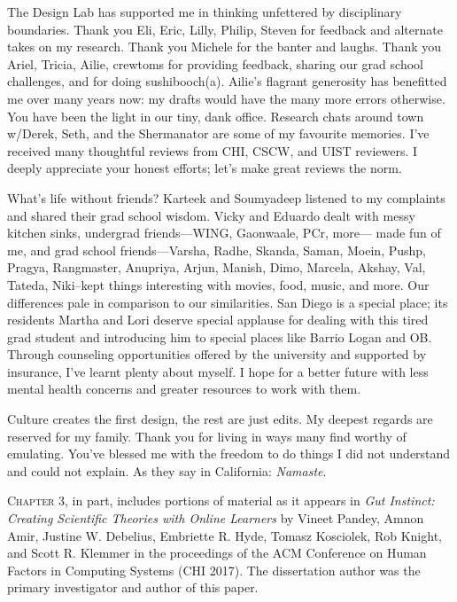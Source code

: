 \begin{frontmatter}
\begin{acknowledgements}
The Design Lab has supported me in thinking unfettered by disciplinary boundaries. Thank you Eli, Eric, Lilly, Philip, Steven for feedback and alternate takes on my research. Thank you Michele for the banter and laughs. Thank you Ariel, Tricia, Ailie, crewtoms for providing feedback, sharing our grad school challenges, and for doing sushibooch(a). Ailie's flagrant generosity has benefitted me over many years now: my drafts would have the many more errors otherwise. You have been the light in our tiny, dank office. Research chats around town w/Derek, Seth, and the Shermanator are some of my favourite memories. I’ve received many thoughtful reviews from CHI, CSCW, and UIST reviewers. I deeply appreciate your honest efforts; let’s make great reviews the norm.

What’s life without friends? Karteek and Soumyadeep listened to my complaints and shared their grad school wisdom. Vicky and Eduardo dealt with messy kitchen sinks, undergrad friends---WING, Gaonwaale, PCr, more--- made fun of me, and grad school friends---Varsha, Radhe, Skanda, Saman, Moein, Pushp, Pragya, Rangmaster, Anupriya, Arjun, Manish, Dimo, Marcela, Akshay, Val, Tateda, Niki--kept things interesting with movies, food, music, and more. Our differences pale in comparison to our similarities. San Diego is a special place; its residents Martha and Lori deserve special applause for dealing with this tired grad student and introducing him to special places like Barrio Logan and OB. Through counseling opportunities offered by the university and supported by insurance, I’ve learnt plenty about myself. I hope for a better future with less mental health concerns and greater resources to work with them.

Culture creates the first design, the rest are just edits. My deepest regards are reserved for my family. Thank you for living in ways many find worthy of emulating. You've blessed me with the freedom to do things I did not understand and could not explain. As they say in California: \textit{Namaste}. 



\vspace{0.25in}

\textsc{Chapter 3}, in part, includes portions of material as it appears in \emph{Gut Instinct: Creating Scientific Theories with Online Learners} by Vineet Pandey, Amnon Amir, Justine W. Debelius, Embriette R. Hyde, Tomasz Kosciolek, Rob Knight, and Scott R. Klemmer in the proceedings of the ACM Conference on Human Factors in Computing Systems (CHI 2017). The dissertation author was the primary investigator and author of this paper.


\end{acknowledgements}
\end{frontmatter}
